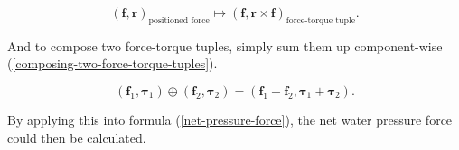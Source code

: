 \begin{equation}
	(\mathbf{f},\mathbf{r})_{\text{positioned force}}
	\mapsto
	(\mathbf{f},\mathbf{r}\times\mathbf{f})_{\text{force-torque tuple}}.
	\label{positioned-force-to-force-torque-tuple}
\end{equation}

And to compose two force-torque tuples, simply sum them up component-wise (\ref{composing-two-force-torque-tuples}).

\begin{equation}
	(\mathbf{f}_1,\mathbf{\tau}_1)
	\oplus
	(\mathbf{f}_2,\mathbf{\tau}_2)
	=
	(\mathbf{f}_1+\mathbf{f}_2,\mathbf{\tau}_1+\mathbf{\tau}_2).
	\label{composing-two-force-torque-tuples}
\end{equation}

By applying this into formula (\ref{net-pressure-force}), the net water pressure force could then be calculated.